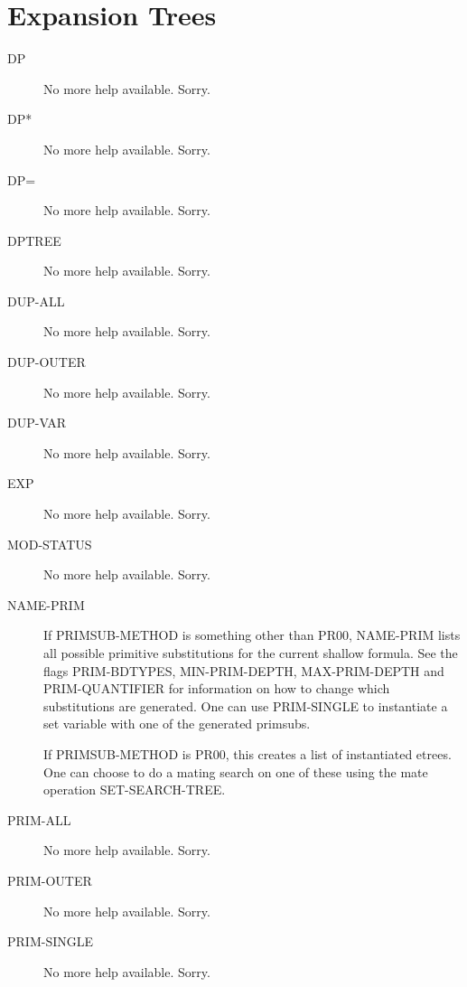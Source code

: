 \section{Expansion Trees}

\begin{description} 
\item[DP]  
No more help available.  Sorry.

\item[DP*]  
No more help available.  Sorry.

\item[DP=]  
No more help available.  Sorry.

\item[DPTREE]  
No more help available.  Sorry.

\item[DUP-ALL]  
No more help available.  Sorry.

\item[DUP-OUTER]  
No more help available.  Sorry.

\item[DUP-VAR]  
No more help available.  Sorry.

\item[EXP]  
No more help available.  Sorry.

\item[MOD-STATUS]  
No more help available.  Sorry.

\item[NAME-PRIM]  
If PRIMSUB-METHOD is something other than PR00,
NAME-PRIM lists all possible primitive substitutions for the current
shallow formula. See the flags PRIM-BDTYPES, MIN-PRIM-DEPTH, 
MAX-PRIM-DEPTH and PRIM-QUANTIFIER for information on how to change
which substitutions are generated.  One can use PRIM-SINGLE to
instantiate a set variable with one of the generated primsubs.

If PRIMSUB-METHOD is PR00, this creates a list of instantiated
etrees.  One can choose to do a mating search on one of these
using the mate operation SET-SEARCH-TREE.

\item[PRIM-ALL]  
No more help available.  Sorry.

\item[PRIM-OUTER]  
No more help available.  Sorry.

\item[PRIM-SINGLE]  
No more help available.  Sorry.


\end{description}
